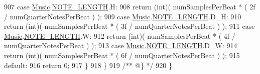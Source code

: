 \begin{DoxyCodeInclude}
907             \textcolor{keywordflow}{case} \hyperlink{class_music}{Music}.\hyperlink{group___music_enums_gaf11b5f079adbb21c800b9eca1c5c3cbd}{NOTE\_LENGTH}.H:
908                 \textcolor{keywordflow}{return} (\textcolor{keywordtype}{int})( numSamplesPerBeat * ( 2f / numQuarterNotesPerBeat ) );
909             \textcolor{keywordflow}{case} \hyperlink{class_music}{Music}.\hyperlink{group___music_enums_gaf11b5f079adbb21c800b9eca1c5c3cbd}{NOTE\_LENGTH}.D\_H:
910                 \textcolor{keywordflow}{return} (\textcolor{keywordtype}{int})( numSamplesPerBeat * ( 3f / numQuarterNotesPerBeat ) );
911             \textcolor{keywordflow}{case} \hyperlink{class_music}{Music}.\hyperlink{group___music_enums_gaf11b5f079adbb21c800b9eca1c5c3cbd}{NOTE\_LENGTH}.W:
912                 \textcolor{keywordflow}{return} (\textcolor{keywordtype}{int})( numSamplesPerBeat * ( 4f / numQuarterNotesPerBeat ) );
913             \textcolor{keywordflow}{case} \hyperlink{class_music}{Music}.\hyperlink{group___music_enums_gaf11b5f079adbb21c800b9eca1c5c3cbd}{NOTE\_LENGTH}.D\_W:
914                 \textcolor{keywordflow}{return} (\textcolor{keywordtype}{int})( numSamplesPerBeat * ( 6f / numQuarterNotesPerBeat ) );
915             \textcolor{keywordflow}{default}:
916                 \textcolor{keywordflow}{return} 0;
917         \}
918     \}\textcolor{comment}{}
919 \textcolor{comment}{    /** @\} */}
920 \}
\end{DoxyCodeInclude}
 